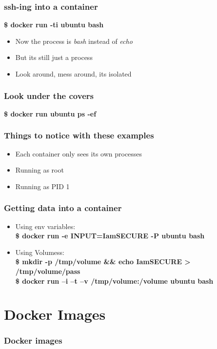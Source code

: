 \documentclass[aspectratio=169,11pt,hyperref={colorlinks=true}]{beamer}
\begin{document}
\begin{frame}
    \frametitle{ssh-ing into a container}
    \textbf{\$ docker run -ti ubuntu bash}
    \begin{itemize}
        \item Now the process is \textit{bash} instead of \textit{echo}
        \item But its still just a process
        \item Look around, mess around, its isolated
    \end{itemize}
\end{frame}

\begin{frame}
    \frametitle{Look under the covers}
    \textbf{\$ docker run ubuntu ps -ef}
\end{frame}

\begin{frame}
    \frametitle{Things to notice with these examples}
    \begin{itemize}
        \item Each container only sees its own processes
        \item Running as root
        \item Running as PID 1
    \end{itemize}
\end{frame}

\begin{frame}
    \frametitle{Getting data into a container}
    \begin{itemize}
        \item Using env variables: \\
           \textbf{\$ docker run -e INPUT=IamSECURE -P ubuntu bash}
       \item Using Volumess: \\
           \textbf{\$ mkdir -p /tmp/volume \&\& echo IamSECURE > /tmp/volume/pass}\\
           \textbf{\$ docker run –i –t –v /tmp/volume:/volume ubuntu bash}
    \end{itemize}
\end{frame}

\section{Docker Images}
\begin{frame}
    \frametitle{Docker images}
     
\end{frame}
\end{document}
